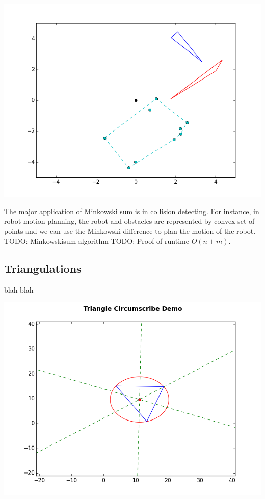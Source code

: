 \documentclass[10pt]{article}
\begin{document}
\begin{multicols}{2}
\centerline{\includegraphics[scale=0.4]{minkowski_noncolliding.png}}
\indent The major application of Minkowski sum is in collision detecting. For instance, in robot motion planning, the robot and obstacles are represented by convex set of points and we can use the Minkowski difference to plan the motion of the robot. \newline
\indent TODO: Minkowskisum algorithm \newline
\indent TODO: Proof of runtime $O(n+m)$. \newline

\subsection{Triangulations}
\indent blah blah \newline \\
\centerline{\includegraphics[scale=0.4]{triangle_circumscribe.png}}
\end{multicols}
\end{document}
